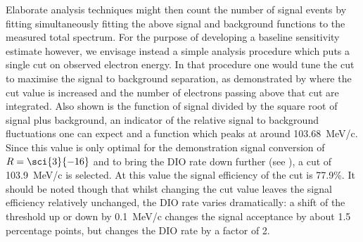 \FigSensMomIntegral
Elaborate analysis techniques might then count the number of signal events by fitting simultaneously fitting the above signal and background functions to the measured total spectrum.
For the purpose of developing a baseline sensitivity estimate however, we envisage instead a simple analysis procedure which puts a single cut on observed electron energy.
In that procedure one would tune the cut to maximise the signal to background separation, as demonstrated by  where the cut value is increased and the number of electrons passing above that cut are integrated.
Also shown is the function of signal divided by the square root of signal plus background, an indicator of the relative signal to background fluctuations one can expect and a function which peaks at around 103.68~MeV/c.
Since this value is only optimal for the demonstration signal conversion of $R=\sci{3}{-16}$ and to bring the \ac{DIO} rate down further (see ), a cut of 103.9~MeV/c is selected.
At this value the signal efficiency of the cut is 77.9\%.
It should be noted though that whilst changing the cut value leaves the signal efficiency relatively unchanged, the DIO rate varies dramatically: a shift of the threshold up or down by 0.1~MeV/c changes the signal acceptance by about 1.5 percentage points, but changes the DIO rate by a factor of 2.

